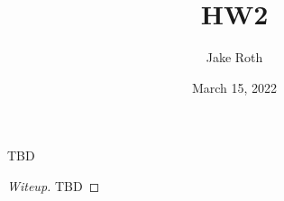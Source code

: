 \documentclass[paper=letter,DIV=10]{scrartcl}
\title{HW2}
\author{Jake Roth}
\date{March 15, 2022}
\begin{document}
\maketitle
\tableofcontents

%
\begin{question}
  TBD
\end{question}
\begin{proof}[Witeup]
  TBD
\end{proof}


% 
% 

%
%
\end{document}
